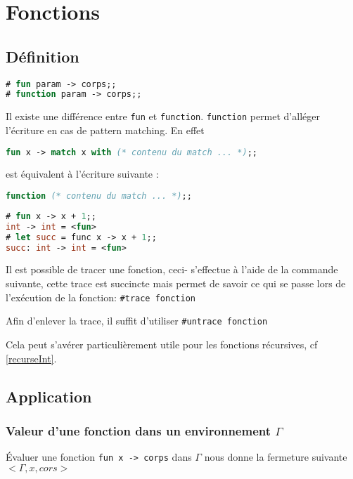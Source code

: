 \chapter{Fonctions}
\label{fonctions}
\section{Définition}
	\begin{lstlisting}[language=Caml, caption=Sytaxe d'une définition de fonction]
# fun param -> corps;;		
# function param -> corps;;
\end{lstlisting}
\begin{remarque}Il existe une différence entre \texttt{fun} et \texttt{function}. \texttt{function} permet d'alléger l'écriture en cas
	de pattern matching. En effet 
	\begin{lstlisting}[language=Caml, numbers=none, framerule=0pt]
	fun x -> match x with (* contenu du match ... *);;
\end{lstlisting}

	est équivalent à l'écriture suivante : 	
	\begin{lstlisting}[language=Caml, numbers=none, framerule=0pt]
	function (* contenu du match ... *);;
	\end{lstlisting}
	\end{remarque}
			\begin{exemple}
	\begin{lstlisting}[language=Caml, caption=Sytaxe d'une définition de fonction, numbers=none, framerule=0pt]
# fun x -> x + 1;;		
int -> int = <fun>
# let succ = func x -> x + 1;; 
succ: int -> int = <fun>
\end{lstlisting}
				\end{exemple}
\begin{remarque}
Il est possible de tracer une fonction, ceci- s'effectue à l'aide de la commande suivante, cette trace est succincte mais permet de savoir ce qui se
passe lors de l'exécution de la fonction:  \texttt{\#trace fonction}

Afin d'enlever la trace, il suffit d'utiliser \texttt{\#untrace fonction}

	Cela peut s'avérer particulièrement utile pour les fonctions récursives, cf \ref{recurseInt}.
\end{remarque}

				\section{Application}
				\subsection{Valeur d'une fonction dans un environnement $\Gamma$}
				Évaluer une fonction \texttt{fun x -> corps} dans $\Gamma$ nous donne la fermeture suivante $<\Gamma, x, cors>$
